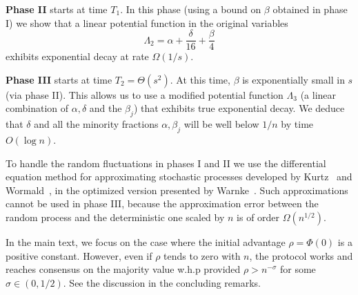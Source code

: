 \documentclass[a4paper,12pt]{article}
\newtheorem{todo}{TODO}
\begin{document}
	\medskip 
	
	{\bf Phase II}  starts at time $T_1$. In this phase (using a bound on $\beta$ obtained in phase I) we show that a linear potential function in the original variables 
	$$\Lambda_2=\alpha+\frac{\delta}{16}+\frac{\beta}{4}$$
	exhibits exponential decay at rate $\Omega(1/s)$.
	
	\medskip

{\bf Phase III} starts at time $T_2=\Theta(s^2)$. At this time, $\beta$ is exponentially small in $s$ (via phase II). This allows us to use a modified
potential function $\Lambda_3$ (a linear combination of $\alpha, \delta$ and the $\beta_j$)  that exhibits true exponential decay. We deduce that $\delta$ and all the minority fractions $\alpha,\beta_j$ will be well below $1/n$ by time $O(\log n)$. 

To handle the random fluctuations in phases I and II we use the differential equation method for approximating stochastic processes developed by Kurtz~\cite{kurtz} and Wormald~\cite{wormald}, in the optimized version presented by Warnke~\cite{warnke}. Such approximations cannot be used in phase III, because the approximation error between the random process and the deterministic one scaled by $n$ is of order $\Omega(n^{1/2})$.

In the main text, we focus on the case where the initial advantage $\rho=\Phi(0)$ is a positive constant. However, even if $\rho$ tends to zero with $n$, the protocol works and reaches consensus on the majority value w.h.p provided 
$\rho>n^{-\sigma}$ for some $\sigma \in (0,1/2)$. See the discussion in the concluding remarks.





\end{document}
